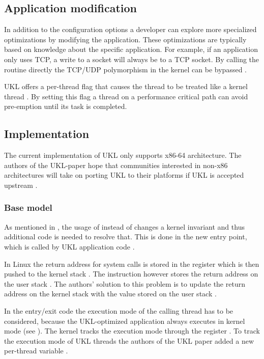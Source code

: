 \documentclass[10pt,twocolumn,a4paper]{article}
\begin{document}
  \subsection{Application modification}\label{sec:application-modification}
    In addition to the configuration options a developer can explore more specialized optimizations
    by modifying the application.
    These optimizations are typically based on knowledge about the specific application.
    For example, if an application only uses TCP, a write to a socket will always be to
    a TCP socket.
    By calling the  routine directly the TCP/UDP polymorphism in the kernel
    can be bypassed \cite{raza23}.
    
    UKL offers a per-thread flag that causes the thread to be treated like a kernel thread \cite{raza23}.
    By setting this flag a thread on a performance critical path can avoid pre-emption
    until its task is completed.

  \subsection{Implementation}
    The current implementation of UKL only supports x86-64 architecture.
    The authors of the UKL-paper hope that communities interested in non-x86 architectures
    will take on porting UKL to their platforms if UKL is accepted upstream \cite{raza23}.

    \subsubsection{Base model}\label{sec:imp:base-model}
      As mentioned in , the usage of  instead of 
      changes a kernel invariant and thus additional code is needed to resolve that.
      This is done in the new  entry point, which is called by
      UKL application code \cite{raza23, ukl-glibc-syscalls}.

      In Linux the return address for system calls is stored in the  register which is then 
      pushed to the kernel stack \cite{raza23}.
      The  instruction however stores the return address on the user stack \cite{raza23}.
      The authors' solution to this problem is to update the return address on the kernel
      stack with the value stored on the user stack \cite{ukl-github-entry}.

      In the entry/exit code the execution mode of the calling thread has to be considered,
      because the UKL-optimized application always executes in kernel mode (see ).
      The kernel tracks the execution mode through the  register \cite{raza23}.
      To track the execution mode of UKL threads the authors of the UKL paper added a 
      new per-thread variable  \cite{ukl-github-entry, ukl-github-inuser-add}.
\end{document}
